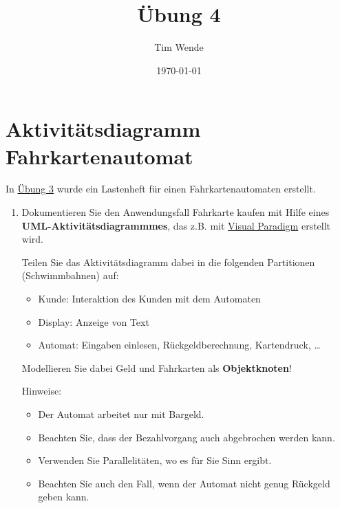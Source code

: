 \documentclass{article}
\author{Tim Wende}
\date{\today}
\title{\textbf{Übung 4}}
\newcommand{\gqq}[1]{\glqq{}#1\grqq{}}
\begin{document}
    \maketitle

    \newpage
    \section{Aktivitätsdiagramm Fahrkartenautomat}
    In \href{https://www.ili.fh-aachen.de/ilias.php?ref_id=813760&obj_id=206096&obj_type=PageObject&cmd=layout&cmdClass=illmpresentationgui&cmdNode=gh&baseClass=ilLMPresentationGUI}{Übung 3} wurde ein Lastenheft für einen Fahrkartenautomaten erstellt.\\
    \begin{enumerate}[label=\alph*.]
        \item Dokumentieren Sie den Anwendungsfall \gqq{Fahrkarte kaufen} mit Hilfe eines \textbf{UML-Aktivitätsdiagrammmes}, das z.B. mit \href{https://www.ili.fh-aachen.de/ilias.php?baseClass=ilLinkResourceHandlerGUI&ref_id=341847&cmd=calldirectlink}{Visual Paradigm} erstellt wird.

            Teilen Sie das Aktivitätsdiagramm dabei in die folgenden Partitionen (Schwimmbahnen) auf:
            \begin{itemize}[label=◦]
                \item Kunde: Interaktion des Kunden mit dem Automaten
                \item Display: Anzeige von Text
                \item Automat: Eingaben einlesen, Rückgeldberechnung, Kartendruck, \ldots
            \end{itemize}
            
            Modellieren Sie dabei Geld und Fahrkarten als \textbf{Objektknoten}!
            
            Hinweise:
            \begin{itemize}[label=◦]
                \item Der Automat arbeitet nur mit Bargeld.
                \item Beachten Sie, dass der Bezahlvorgang auch abgebrochen werden kann.
                \item Verwenden Sie Parallelitäten, wo es für Sie Sinn ergibt.
                \item Beachten Sie auch den Fall, wenn der Automat nicht genug Rückgeld geben kann.
            \end{itemize}


\end{enumerate}
\end{document}
